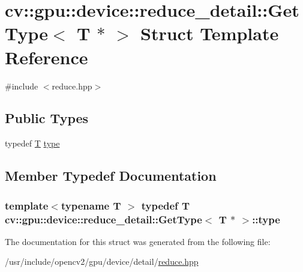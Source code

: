 \hypertarget{structcv_1_1gpu_1_1device_1_1reduce__detail_1_1GetType_3_01T_01_5_01_4}{\section{cv\-:\-:gpu\-:\-:device\-:\-:reduce\-\_\-detail\-:\-:Get\-Type$<$ T $\ast$ $>$ Struct Template Reference}
\label{structcv_1_1gpu_1_1device_1_1reduce__detail_1_1GetType_3_01T_01_5_01_4}
}


{\ttfamily \#include $<$reduce.\-hpp$>$}

\subsection*{Public Types}
\begin{DoxyCompactItemize}
\item 
typedef \hyperlink{calib3d_8hpp_a3efb9551a871ddd0463079a808916717}{T} \hyperlink{structcv_1_1gpu_1_1device_1_1reduce__detail_1_1GetType_3_01T_01_5_01_4_a5e94d0cfe135090e10edb798925f4c4d}{type}
\end{DoxyCompactItemize}


\subsection{Member Typedef Documentation}
\hypertarget{structcv_1_1gpu_1_1device_1_1reduce__detail_1_1GetType_3_01T_01_5_01_4_a5e94d0cfe135090e10edb798925f4c4d}{
\subsubsection[{type}]{\setlength{\rightskip}{0pt plus 5cm}template$<$typename T $>$ typedef {\bf T} {\bf cv\-::gpu\-::device\-::reduce\-\_\-detail\-::\-Get\-Type}$<$ {\bf T} $\ast$ $>$\-::{\bf type}}}\label{structcv_1_1gpu_1_1device_1_1reduce__detail_1_1GetType_3_01T_01_5_01_4_a5e94d0cfe135090e10edb798925f4c4d}


The documentation for this struct was generated from the following file\-:\begin{DoxyCompactItemize}
\item 
/usr/include/opencv2/gpu/device/detail/\hyperlink{detail_2reduce_8hpp}{reduce.\-hpp}\end{DoxyCompactItemize}
